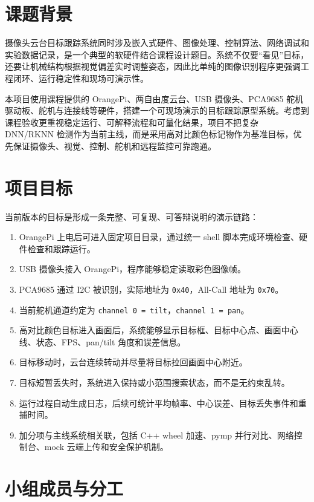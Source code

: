 \documentclass[
  oneside,
  degree=bachelor,
  field=science,
  fullwidthstop=circle,
  fontset=windows,
  times=false,
  minted=false,
  biblatex=false,
  algo=algpseudocode,
]{tongjithesis}
\newcommand{\code}[1]{\texttt{#1}}
\begin{document}
\section{课题背景}

摄像头云台目标跟踪系统同时涉及嵌入式硬件、图像处理、控制算法、网络调试和实验数据记录，是一个典型的软硬件结合课程设计题目。系统不仅要“看见”目标，还要让机械结构根据视觉偏差实时调整姿态，因此比单纯的图像识别程序更强调工程闭环、运行稳定性和现场可演示性。

本项目使用课程提供的 OrangePi、两自由度云台、USB 摄像头、PCA9685 舵机驱动板、舵机与连接线等硬件，搭建一个可现场演示的目标跟踪原型系统。考虑到课程验收更重视稳定运行、可解释流程和可量化结果，项目不把复杂 DNN/RKNN 检测作为当前主线，而是采用高对比颜色标记物作为基准目标，优先保证摄像头、视觉、控制、舵机和远程监控可靠跑通。

\section{项目目标}

当前版本的目标是形成一条完整、可复现、可答辩说明的演示链路：

\begin{enumerate}
  \item OrangePi 上电后可进入固定项目目录，通过统一 shell 脚本完成环境检查、硬件检查和跟踪运行。
  \item USB 摄像头接入 OrangePi，程序能够稳定读取彩色图像帧。
  \item PCA9685 通过 I2C 被识别，实际地址为 \code{0x40}，All-Call 地址为 \code{0x70}。
  \item 当前舵机通道约定为 \code{channel 0 = tilt}，\code{channel 1 = pan}。
  \item 高对比颜色目标进入画面后，系统能够显示目标框、目标中心点、画面中心线、状态、FPS、pan/tilt 角度和误差信息。
  \item 目标移动时，云台连续转动并尽量将目标拉回画面中心附近。
  \item 目标短暂丢失时，系统进入保持或小范围搜索状态，而不是无约束乱转。
  \item 运行过程自动生成日志，后续可统计平均帧率、中心误差、目标丢失事件和重捕时间。
  \item 加分项与主线系统相关联，包括 C++ wheel 加速、pymp 并行对比、网络控制台、mock 云端上传和安全保护机制。
\end{enumerate}

\section{小组成员与分工}
\end{document}
